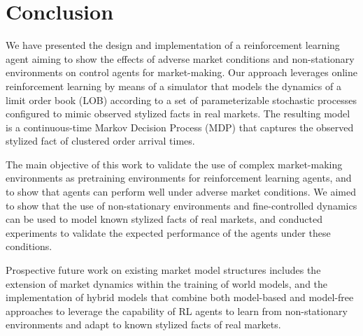 \section{Conclusion}
\label{sec:conclusion}
We have presented the design and implementation of a reinforcement learning agent aiming to show
the effects of adverse market conditions and non-stationary environments on control agents for market-making.
Our approach leverages online reinforcement learning by means of a simulator that models the dynamics of a limit order book (LOB)
according to a set of parameterizable stochastic processes configured to mimic observed stylized facts in real markets.
The resulting model is a continuous-time Markov Decision Process (MDP) that captures the observed stylized fact of clustered order arrival times.

The main objective of this work to validate the use of complex market-making environments as
pretraining environments for reinforcement learning agents, and to show that agents can perform well under adverse market conditions.
We aimed to show that the use of non-stationary environments and fine-controlled dynamics can be used to model known stylized facts of real markets,
and conducted experiments to validate the expected performance of the agents under these conditions.

Prospective future work on existing market model structures includes the extension of market dynamics within
the training of world models, and the implementation of hybrid models that combine both model-based and model-free approaches
to leverage the capability of RL agents to learn from non-stationary environments and adapt to known stylized facts of real markets.
